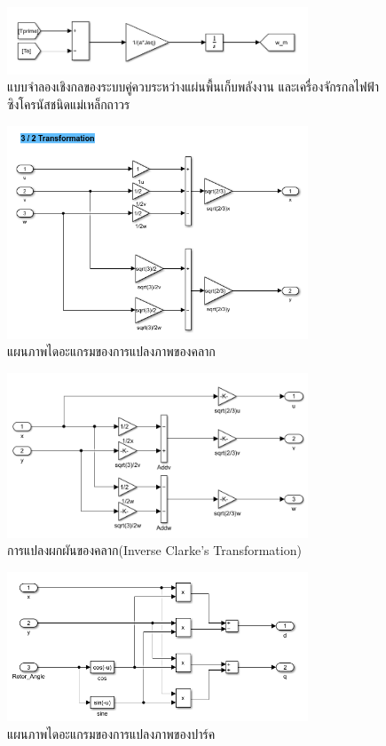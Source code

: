 \documentclass[11pt,a4paper]{article}
\begin{document}
\begin{figure}[H]
    \centering
    \includegraphics[width=0.8\textwidth]{mech_ac_coupling_model.png}
    \caption{แบบจำลองเชิงกลของระบบคู่ควบระหว่างแผ่นพื้นเก็บพลังงาน และเครื่องจักรกลไฟฟ้าซิงโครนัสชนิดแม่เหล็กถาวร}
\end{figure}
\begin{figure}[H]
    \centering
    \includegraphics[width=0.8\textwidth]{clarke_trans.png}
    \caption{แผนภาพไดอะแกรมของการแปลงภาพของคลาก}
\end{figure}
\begin{figure}[H]
    \centering
    \includegraphics[width=0.8\textwidth]{inverse_clarke.png}
    \caption{การแปลงผกผันของคลาก(Inverse Clarke's Transformation)}
\end{figure}
\begin{figure}[H]
    \centering
    \includegraphics[width=0.8\textwidth]{park_trans.png}
    \caption{แผนภาพไดอะแกรมของการแปลงภาพของปาร์ค}
\end{figure}
\end{document}

